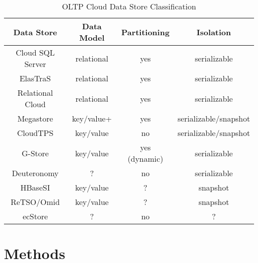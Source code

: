 \documentclass[10pt,final,journal]{IEEEtran}
\begin{document}
\begin{table}[!t]
\renewcommand{\arraystretch}{1.3}
\caption{OLTP Cloud Data Store Classification}
\label{classification}
\centering
\begin{tabular}{|c|c|c|c|}
\hline
\bfseries Data Store  & \bfseries Data Model & \bfseries  Partitioning & \bfseries Isolation \\
\hline
\hline
Cloud SQL Server & relational & yes & serializable \\
ElasTraS & relational & yes & serializable \\
Relational Cloud & relational & yes & serializable \\
Megastore & key/value+ & yes & serializable/snapshot \\
CloudTPS & key/value & no & serializable/snapshot \\
G-Store & key/value & yes (dynamic) & serializable \\
Deuteronomy & ? & no &serializable \\
HBaseSI & key/value & ? & snapshot \\
ReTSO/Omid & key/value & ? & snapshot \\
ecStore & ? & no & ? \\
\hline
\end{tabular}
\end{table}





\section{Methods}
\end{document}
